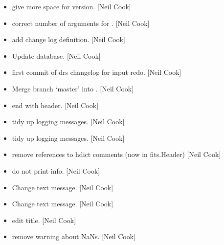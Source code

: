 \documentclass[a4paper,10pt,english]{report}
\begin{document}
\begin{itemize}
\item {} 
 \sphinxhyphen{} give more space for version. {[}Neil Cook{]}

\item {} 
 \sphinxhyphen{} correct number of arguments for
. {[}Neil Cook{]}

\item {} 
 \sphinxhyphen{} add change log definition. {[}Neil Cook{]}

\item {} 
Update database. {[}Neil Cook{]}

\item {} 
 \sphinxhyphen{} first commit of drs changelog for input redo. {[}Neil
Cook{]}

\item {} 
Merge branch ‘master’ into . {[}Neil Cook{]}

\item {} 
 \sphinxhyphen{} end with header. {[}Neil Cook{]}

\item {} 
 \sphinxhyphen{} tidy up logging messages. {[}Neil Cook{]}

\item {} 
 \sphinxhyphen{} tidy up logging messages. {[}Neil Cook{]}

\item {} 
 \sphinxhyphen{} remove references to hdict comments (now in fits.Header)
{[}Neil Cook{]}

\item {} 
 \sphinxhyphen{} do not print info. {[}Neil Cook{]}

\item {} 
Change text message. {[}Neil Cook{]}

\item {} 
Change text message. {[}Neil Cook{]}

\item {} 
 \sphinxhyphen{} edit title. {[}Neil Cook{]}

\item {} 
 \sphinxhyphen{} remove warning about NaNs. {[}Neil Cook{]}


\end{itemize}
\end{document}
